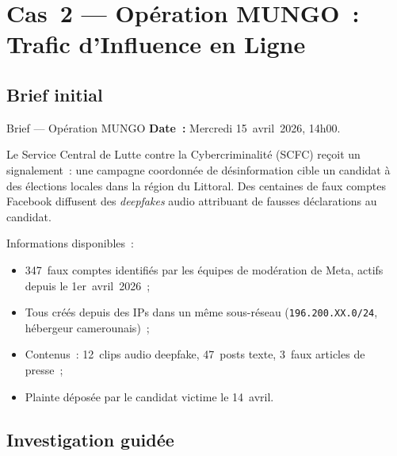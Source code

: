 \section{Cas~2 --- Opération MUNGO~: Trafic d'Influence en Ligne}
\label{sec:cas-mungo}

\subsection{Brief initial}

\begin{boxscenario}{Brief --- Opération MUNGO}
\textbf{Date~:} Mercredi 15~avril~2026, 14h00.

Le Service Central de Lutte contre la Cybercriminalité (SCFC) reçoit
un signalement~: une campagne coordonnée de désinformation cible un
candidat à des élections locales dans la région du Littoral. Des
centaines de faux comptes Facebook diffusent des \textit{deepfakes}
audio attribuant de fausses déclarations au candidat.

Informations disponibles~:
\begin{itemize}
    \item 347~faux comptes identifiés par les équipes de modération
          de Meta, actifs depuis le 1er~avril~2026~;
    \item Tous créés depuis des IPs dans un même sous-réseau
          (\texttt{196.200.XX.0/24}, hébergeur camerounais)~;
    \item Contenus~: 12~clips audio deepfake, 47~posts texte,
          3~faux articles de presse~;
    \item Plainte déposée par le candidat victime le 14~avril.
\end{itemize}
\end{boxscenario}

\subsection{Investigation guidée}

